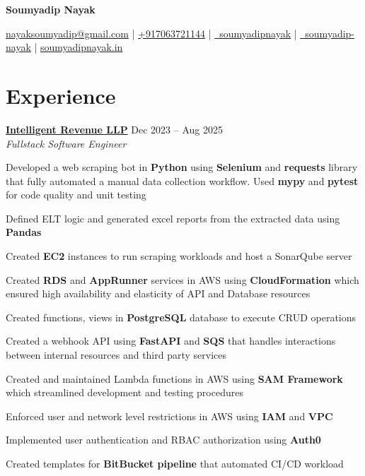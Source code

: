 \documentclass[a4paper,10pt]{article}
\begin{document}
\begin{center}
{\LARGE \textbf{Soumyadip Nayak}}

\vspace{4pt}

\href{mailto:nayaksoumyadip@gmail.com}{nayaksoumyadip@gmail.com}
 | 
\href{tel:+917063721144}{+917063721144}
 | 
\href{https://github.com/soumyadipnayak}{\faGithub\ soumyadipnayak}
 |
\href{https://www.linkedin.com/in/soumyadip-nayak/}{\faLinkedin\ soumyadip-nayak}
 | 
\href{https://www.soumyadipnayak.in}{soumyadipnayak.in}
\end{center}

\vspace{2pt}

\section*{Experience}
\textbf{\href{https://www.intellirevenue.com}{Intelligent Revenue LLP}} \hfill Dec 2023 -- Aug 2025\\
\textit{Fullstack Software Engineer}
\begin{experiencelist}
\item Developed a web scraping bot in \textbf{Python} using \textbf{Selenium} and \textbf{requests} library that fully automated a manual data collection workflow. Used \textbf{mypy} and \textbf{pytest} for code quality and unit testing
\item Defined ELT logic and generated excel reports from the extracted data using \textbf{Pandas}
\item Created \textbf{EC2} instances to run scraping workloads and host a SonarQube server
\item Created \textbf{RDS} and \textbf{AppRunner} services in AWS using \textbf{CloudFormation} which ensured high availability and elasticity of API and Database resources
\item Created functions, views in \textbf{PostgreSQL} database to execute CRUD operations
\item Created a webhook API using \textbf{FastAPI} and \textbf{SQS} that handles interactions between internal resources and third party services
\item Created and maintained Lambda functions in AWS using \textbf{SAM Framework} which streamlined development and testing procedures
\item Enforced user and network level restrictions in AWS using \textbf{IAM} and \textbf{VPC}
\item Implemented user authentication and RBAC authorization using \textbf{Auth0}
\item Created templates for \textbf{BitBucket pipeline} that automated CI/CD workload
\end{experiencelist}
\end{document}
